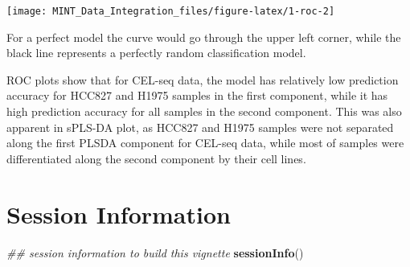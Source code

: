 \documentclass[]{book}
\newenvironment{Shaded}{\begin{snugshade}}{\end{snugshade}}
\newcommand{\CommentTok}[1]{\textcolor[rgb]{0.56,0.35,0.01}{\textit{#1}}}
\newcommand{\KeywordTok}[1]{\textcolor[rgb]{0.13,0.29,0.53}{\textbf{#1}}}
\newcommand{\NormalTok}[1]{#1}
\theoremstyle{definition}
\theoremstyle{definition}
\theoremstyle{definition}
\theoremstyle{remark}
\begin{document}
\begin{center}\texttt{[image: MINT\_Data\_Integration\_files/figure-latex/1-roc-2]} \end{center}

For a perfect model the curve would go through the upper left corner,
while the black line represents a perfectly random classification model.

ROC plots show that for CEL-seq data, the model has relatively low
prediction accuracy for HCC827 and H1975 samples in the first component,
while it has high prediction accuracy for all samples in the second
component. This was also apparent in sPLS-DA plot, as HCC827 and H1975
samples were not separated along the first PLSDA component for CEL-seq
data, while most of samples were differentiated along the second
component by their cell lines.

\hypertarget{session-information}{%
\section{Session Information}\label{session-information}}

\begin{Shaded}
\begin{Highlighting}[]
\CommentTok{## session information to build this vignette}
\KeywordTok{sessionInfo}\NormalTok{()}
\end{Highlighting}
\end{Shaded}
\end{document}
